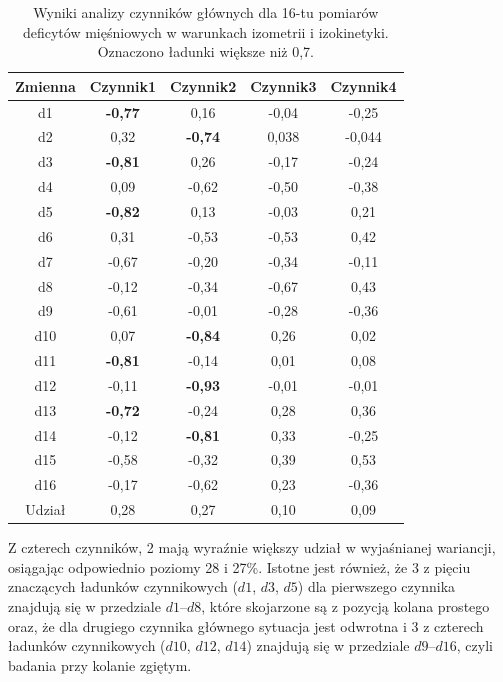 \begin{table}[h]
	\centering
	\setlength{\tabcolsep}{3pt}
	\setlength\extrarowheight{2pt}
	\caption{Wyniki analizy czynników głównych dla 16-tu pomiarów deficytów mięśniowych w warunkach izometrii i izokinetyki. Oznaczono ładunki większe niż 0,7.}
	\label{tab:pca-muscles}
	\begin{tabular}{c|c|c|c|c}

		Zmienna&Czynnik1&Czynnik2&Czynnik3&Czynnik4 \\
		\hline \hline
		d1&\textbf{-0,77}&0,16&-0,04&-0,25 \\
		\hline
		d2&0,32&\textbf{-0,74}&0,038&-0,044 \\
		\hline
		d3&\textbf{-0,81}&0,26&-0,17&-0,24 \\
		\hline
		d4&0,09&-0,62&-0,50&-0,38 \\
		\hline
		d5&\textbf{-0,82}&0,13&-0,03&0,21 \\
		\hline
		d6&0,31&-0,53&-0,53&0,42 \\
		\hline
		d7&-0,67&-0,20&-0,34&-0,11 \\
		\hline
		d8&-0,12&-0,34&-0,67&0,43 \\
		\hline
		d9&-0,61&-0,01&-0,28&-0,36 \\
		\hline
		d10&0,07&\textbf{-0,84}&0,26&0,02 \\
		\hline
		d11&\textbf{-0,81}&-0,14&0,01&0,08 \\
		\hline
		d12&-0,11&\textbf{-0,93}&-0,01&-0,01 \\
		\hline
		d13&\textbf{-0,72}&-0,24&0,28&0,36 \\
		\hline
		d14&-0,12&\textbf{-0,81}&0,33&-0,25 \\
		\hline
		d15&-0,58&-0,32&0,39&0,53 \\
		\hline
		d16&-0,17&-0,62&0,23&-0,36 \\
		\hline\hline
		Udział&0,28&0,27&0,10&0,09 \\

	\end{tabular}
\end{table}

Z czterech czynników, 2 mają wyraźnie większy udział w wyjaśnianej wariancji, osiągając odpowiednio poziomy 28 i 27\%. Istotne jest również, że 3 z pięciu znaczących ładunków czynnikowych ($d1$, $d3$, $d5$) dla pierwszego czynnika znajdują się w przedziale $d1$--$d8$, które skojarzone są z pozycją kolana prostego oraz, że dla drugiego czynnika głównego sytuacja jest odwrotna i 3 z czterech ładunków czynnikowych ($d10$, $d12$, $d14$) znajdują się w przedziale $d9$--$d16$, czyli badania przy kolanie zgiętym. 

